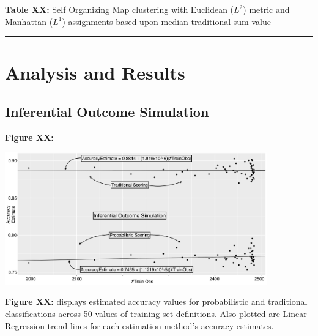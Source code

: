 \documentclass[12pt,]{article}
\begin{document}
\textbf{Table XX:} Self Organizing Map clustering with Euclidean
(\(L^{2}\)) metric and Manhattan (\(L^{1}\)) assignments based upon
median traditional sum value

\begin{center}\rule{0.5\linewidth}{\linethickness}\end{center}

\hypertarget{analysis-and-results}{%
\section{Analysis and Results}\label{analysis-and-results}}

\hypertarget{inferential-outcome-simulation}{%
\subsection{Inferential Outcome
Simulation}\label{inferential-outcome-simulation}}

\textbf{Figure XX:}

\begin{center}
\includegraphics[width=0.85\textwidth]{Sup1Graph.jpg}
\end{center}

\textbf{Figure XX:} displays estimated accuracy values for probabilistic
and traditional classifications across 50 values of training set
definitions. Also plotted are Linear Regression trend lines for each
estimation method's accuracy estimates.
\end{document}
